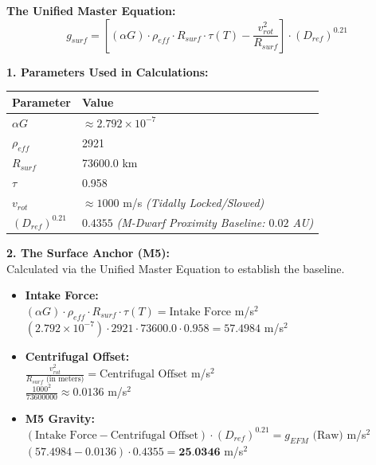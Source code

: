 \documentclass[11pt, a4paper]{article}
\begin{document}
  \vspace{0.5em}
  \noindent \textbf{The Unified Master Equation:}
  $$ g_{surf} = \left[ (\alpha G) \cdot \rho_{eff} \cdot R_{surf} \cdot \tau(T) - \frac{v_{rot}^2}{R_{surf}} \right] \cdot (D_{ref})^{0.21} $$

  \vspace{0.5em}
  \noindent \textbf{1. Parameters Used in Calculations:} \\[0.5em]
  \begingroup
  \renewcommand{\arraystretch}{1.3}
  \hspace*{2em}
  \begin{tabular}{|l|l|}
    \hline
    \textbf{Parameter} & \textbf{Value} \\ \hline
    $\alpha G$ & $\approx 2.792 \times 10^{-7}$ \\ \hline
    $\rho_{eff}$ & 2921 \\ \hline
    $R_{surf}$ & 73600.0 km \\ \hline
    $\tau$ & 0.958 \\ \hline
    $v_{rot}$ & $\approx 1000$ m/s \textit{(Tidally Locked/Slowed)} \\ \hline
    $(D_{ref})^{0.21}$ & $0.4355$ \textit{(M-Dwarf Proximity Baseline: $0.02$ AU)} \\ \hline
  \end{tabular}
  \endgroup

  \vspace{1.0em}
  \noindent \textbf{2. The Surface Anchor (M5):} \\
  \hspace*{1em} Calculated via the Unified Master Equation to establish the baseline.
  \begin{itemize}
    \item \textbf{Intake Force:} \\[0.5em]
    \hspace*{2em} $(\alpha G) \cdot \rho_{eff} \cdot R_{surf} \cdot \tau(T) = \text{Intake Force}$ m/s$^2$ \\[1em]
    \hspace*{2em} $(2.792 \times 10^{-7}) \cdot 2921 \cdot 73600.0 \cdot 0.958 = 57.4984$ m/s$^2$
    
    \item \textbf{Centrifugal Offset:} \\[0.5em]
    \hspace*{2em} $\frac{v_{rot}^2}{R_{surf} \text{ (in meters)}} = \text{Centrifugal Offset}$ m/s$^2$ \\[1em]
    \hspace*{2em} $\frac{1000^2}{73600000} \approx 0.0136$ m/s$^2$
    
    \item \textbf{M5 Gravity:} \\[0.5em]
    \hspace*{2em} $(\text{Intake Force} - \text{Centrifugal Offset}) \cdot (D_{ref})^{0.21} = g_{EFM} \text{ (Raw)}$ m/s$^2$ \\[1em]
    \hspace*{2em} $(57.4984 - 0.0136) \cdot 0.4355 = \textbf{25.0346}$ m/s$^2$
  \end{itemize}
\end{document}
